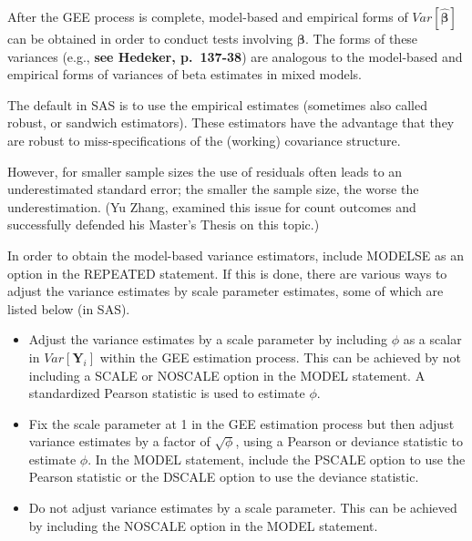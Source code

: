 \documentclass[
  9pt,
  ignorenonframetext,
]{beamer}
\begin{document}
\begin{frame}{}
\protect\hypertarget{section-5}{}
After the GEE process is complete, model-based and empirical forms of
\(Var[\pmb {\hat \beta}]\) can be obtained in order to conduct tests
involving \(\pmb \beta\). The forms of these variances (e.g.,
\textbf{see Hedeker, p.~137-38}) are analogous to the model-based and
empirical forms of variances of beta estimates in mixed models.

The default in SAS is to use the empirical estimates (sometimes also
called robust, or sandwich estimators). These estimators have the
advantage that they are robust to miss-specifications of the (working)
covariance structure.

However, for smaller sample sizes the use of residuals often leads to an
underestimated standard error; the smaller the sample size, the worse
the underestimation. (Yu Zhang, examined this issue for count outcomes
and successfully defended his Master's Thesis on this topic.)
\end{frame}

\begin{frame}{}
\protect\hypertarget{section-6}{}
In order to obtain the model-based variance estimators, include MODELSE
as an option in the REPEATED statement. If this is done, there are
various ways to adjust the variance estimates by scale parameter
estimates, some of which are listed below (in SAS).

\begin{itemize}
\item
  Adjust the variance estimates by a scale parameter by including
  \(\phi\) as a scalar in \(Var[\pmb Y_i]\) within the GEE estimation
  process. This can be achieved by not including a SCALE or NOSCALE
  option in the MODEL statement. A standardized Pearson statistic is
  used to estimate \(\phi\).
\item
  Fix the scale parameter at 1 in the GEE estimation process but then
  adjust variance estimates by a factor of \(\sqrt \phi\), using a
  Pearson or deviance statistic to estimate \(\phi\). In the MODEL
  statement, include the PSCALE option to use the Pearson statistic or
  the DSCALE option to use the deviance statistic.
\item
  Do not adjust variance estimates by a scale parameter. This can be
  achieved by including the NOSCALE option in the MODEL statement.
\end{itemize}
\end{frame}
\end{document}
